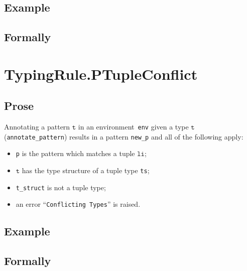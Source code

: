 \documentclass{book}
\newcommand\vt[0]{\texttt{t}}
\newcommand\vli[0]{\texttt{li}}
\begin{document}
\begin{itemize}
  \subsection{Example}



\begin{emptyformal}
    \subsection{Formally}
\end{emptyformal}



\section{TypingRule.PTupleConflict \label{sec:TypingRule.PTupleConflict}}

  \subsection{Prose}
   Annotating a pattern $\vt$ in an environment~\texttt{env} given a type $\vt$ (\texttt{annotate\_pattern}) results in a pattern \texttt{new\_p} and all of the following apply:
   \begin{itemize}
   \item \texttt{p} is the pattern which matches a tuple $\vli$;
   \item $\vt$ has the type structure of a tuple type \texttt{ts};
   \item \texttt{t\_struct} is not a tuple type;
   \item an error ``\texttt{Conflicting Types}'' is raised.
   \end{itemize}

  \subsection{Example}



\begin{emptyformal}
    \subsection{Formally}
\end{emptyformal}


\end{itemize}
\end{document}
